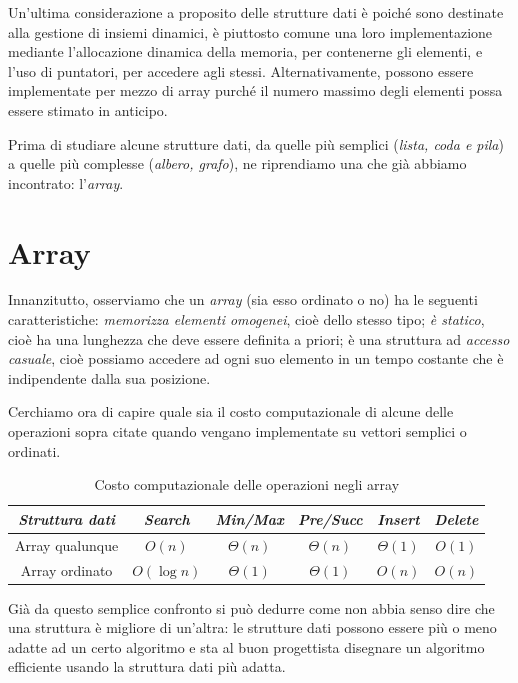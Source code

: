 Un’ultima considerazione a proposito delle strutture dati è poiché sono destinate alla gestione di insiemi dinamici, è piuttosto comune una loro implementazione mediante l’allocazione dinamica della memoria, per contenerne gli elementi, e l’uso di puntatori, per accedere agli stessi. Alternativamente, possono essere implementate per mezzo di array purché il numero massimo degli elementi possa essere stimato in anticipo.

Prima di studiare alcune strutture dati, da quelle più semplici (\textit{lista, coda e pila}) a quelle più complesse (\textit{albero, grafo}), ne riprendiamo una  che già abbiamo incontrato: l’\textit{array}.

\section{Array}
Innanzitutto, osserviamo che un \textit{array} (sia esso ordinato o no) ha le seguenti caratteristiche: \textit{memorizza elementi omogenei}, cioè dello stesso tipo; \textit{è statico}, cioè ha una lunghezza che deve essere definita a priori; è una struttura ad \textit{accesso casuale}, cioè possiamo accedere ad ogni suo elemento in un tempo costante che è indipendente dalla sua posizione.

Cerchiamo ora di capire quale sia il costo computazionale di alcune delle operazioni sopra citate quando vengano implementate su vettori semplici o ordinati.

\begin{table}[H]
    \centering
    \begin{tabular}{|c|c|c|c|c|c|}
         \hline \textit{Struttura dati} & \textit{Search} & \textit{Min/Max} & \textit{Pre/Succ} & \textit{Insert} & \textit{Delete}\\\hline\hline
         Array qualunque & $O(n)$ & $\Theta(n)$ & $\Theta(n)$ & $\Theta(1)$ & $O(1)$\\\hline
         Array ordinato & $O(\log n)$ & $\Theta(1)$ & $\Theta(1)$ & $O(n)$ & $O(n)$\\\hline
    \end{tabular}
    \caption{Costo computazionale delle operazioni negli array}
    \label{tab:CCArray}
\end{table}

Già da questo semplice confronto si può dedurre come non abbia senso dire che una struttura è migliore di un’altra:
le strutture dati possono essere più o meno adatte ad un certo algoritmo e sta al
buon progettista disegnare un algoritmo efficiente usando la struttura dati più
adatta.

